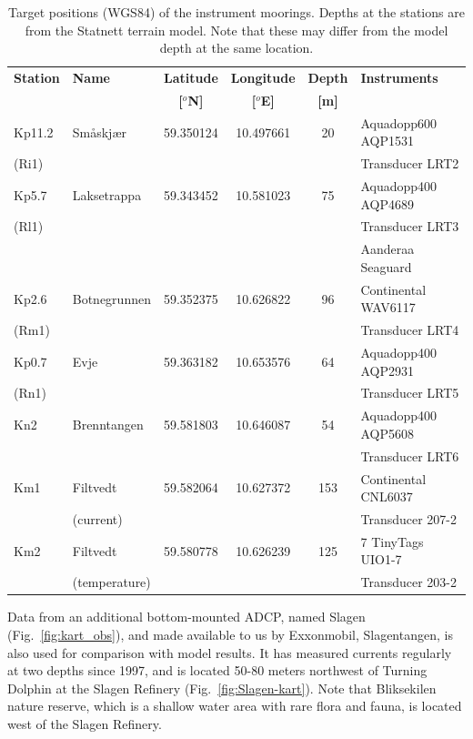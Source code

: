 
\begin{table}[ht] 
\caption{Target positions (WGS84) of the instrument moorings. Depths at the stations are from the Statnett terrain model. Note that these may differ from the model depth at the same location.} 
\label{tab:Statnett} 
\centering 
\begin{tabular}{|llcccl|} 
\hline  
{\bf Station} & {\bf Name} & {\bf Latitude} & {\bf Longitude} & {\bf Depth} & {\bf Instruments} \\ 
              &            & {\bf [$^o$N]}  & {\bf [$^o$E]}   & {\bf [m]}   & \\ \hline
Kp11.2 & Sm\aa skj\ae r & 59.350124 & 10.497661 & 20 & Aquadopp600 AQP1531 \\
(Ri1) & & & & & Transducer LRT2 \\ \hline
Kp5.7 & Laksetrappa & 59.343452 & 10.581023 & 75 & Aquadopp400 AQP4689 \\
(Rl1) &&&&& Transducer LRT3 \\
      &&&&& Aanderaa Seaguard \\  \hline
Kp2.6 & Botnegrunnen & 59.352375 & 10.626822 & 96 & Continental WAV6117 \\
(Rm1) &&&&& Transducer LRT4 \\ \hline
Kp0.7 & Evje & 59.363182 & 10.653576 & 64 & Aquadopp400 AQP2931 \\
(Rn1) &&&&& Transducer LRT5 \\ \hline
Kn2 & Brenntangen & 59.581803 & 10.646087 & 54 & Aquadopp400 AQP5608 \\
      &&&&& Transducer LRT6 \\ \hline
Km1 & Filtvedt & 59.582064 & 10.627372 & 153 & Continental CNL6037 \\
      & (current) &&&& Transducer 207-2 \\ \hline
Km2 & Filtvedt & 59.580778 & 10.626239 & 125 & 7 TinyTags UIO1-7 \\
      & (temperature) &&&& Transducer 203-2 \\
\hline
\end{tabular}
\end{table}

Data from an additional bottom-mounted ADCP, named Slagen (Fig.~\ref{fig:kart_obs}), and made available to us by Exxonmobil, Slagentangen, is also used for comparison with model results. It has measured currents regularly at two depths since 1997, and is located 50-80 meters northwest of Turning Dolphin at the Slagen Refinery (Fig.~\ref{fig:Slagen-kart}). Note that Bliksekilen nature reserve, which is a shallow water area with rare flora and fauna, is located west of the Slagen Refinery. 

